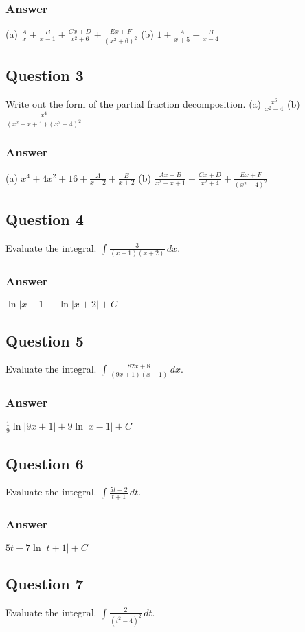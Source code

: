 \documentclass{article}
\begin{document}
\subsubsection*{Answer}
(a) $\frac{A}{x} + \frac{B}{x-1} + \frac{Cx+D}{x^2+6} + \frac{Ex+F}{(x^2+6)^2}$
(b) $1 + \frac{A}{x+5} + \frac{B}{x-4}$

\subsection*{Question 3}
Write out the form of the partial fraction decomposition.
(a) $\frac{x^6}{x^2-4}$
(b) $\frac{x^4}{(x^2-x+1)(x^2+4)^2}$
\subsubsection*{Answer}
(a) $x^4+4x^2+16 + \frac{A}{x-2} + \frac{B}{x+2}$
(b) $\frac{Ax+B}{x^2-x+1} + \frac{Cx+D}{x^2+4} + \frac{Ex+F}{(x^2+4)^2}$

\subsection*{Question 4}
Evaluate the integral. $\int \frac{3}{(x-1)(x+2)} \,dx$.
\subsubsection*{Answer}
$ \ln|x-1| - \ln|x+2| + C $

\subsection*{Question 5}
Evaluate the integral. $\int \frac{82x+8}{(9x+1)(x-1)} \,dx$.
\subsubsection*{Answer}
$ \frac{1}{9}\ln|9x+1| + 9\ln|x-1| + C $

\subsection*{Question 6}
Evaluate the integral. $\int \frac{5t-2}{t+1} \,dt$.
\subsubsection*{Answer}
$ 5t - 7\ln|t+1| + C $

\subsection*{Question 7}
Evaluate the integral. $\int \frac{2}{(t^2-4)^2} \,dt$.
\end{document}
